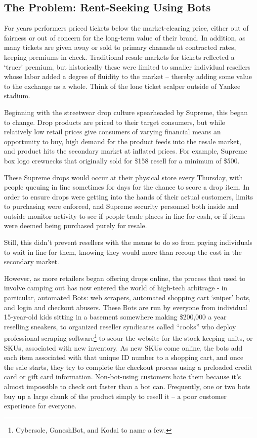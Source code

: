 \documentclass[runningheads]{llncs}
\begin{document}
\subsection{The Problem: Rent-Seeking Using Bots} 
For years performers priced tickets below the market-clearing price, either out of fairness or out of concern for the long-term value of their brand.\cite{4}   In addition, as many tickets are given away or sold to primary channels at contracted rates, keeping premiums in check. Traditional resale markets for tickets reflected a ‘truer’ premium, but historically these were limited to smaller individual resellers whose labor added a degree of fluidity to the market – thereby adding some value to the exchange as a whole.  Think of the lone ticket scalper outside of Yankee stadium.

Beginning with the streetwear drop culture spearheaded by Supreme, this began to change.  Drop products are priced to their target consumers, but while relatively low retail prices give consumers of varying financial means an opportunity to buy, high demand for the product feeds into the resale market, and product hits the secondary market at inflated prices. For example, Supreme box logo crewnecks that originally sold for \$158 resell for a minimum of \$500.\cite{5}

These Supreme drops would occur at their physical store every Thursday, with people queuing in line sometimes for days for the chance to score a drop item.  In order to ensure drops were getting into the hands of their actual customers, limits to purchasing were enforced, and Supreme security personnel both inside and outside monitor activity to see if people trade places in line for cash, or if items were deemed being purchased purely for resale.\cite{6}

Still, this didn’t prevent resellers with the means to do so from paying individuals to wait in line for them, knowing they would more than recoup the cost in the secondary market.

However, as more retailers began offering drops online, the process that used to involve camping out has now entered the world of high-tech arbitrage - in particular, automated Bots: web scrapers, automated shopping cart ‘sniper’ bots, and login and checkout abusers.\cite{3} These Bots are run by everyone from individual 15-year-old kids sitting in a basement somewhere making \$200,000 a year reselling sneakers, to organized reseller syndicates called “cooks” who deploy professional scraping software\footnote{Cybersole, GaneshBot, and Kodai to name a few.}  to scour the website for the stock-keeping units, or SKUs, associated with new inventory. As new SKUs come online, the bots add each item associated with that unique ID number to a shopping cart, and once the sale starts, they try to complete the checkout process using a preloaded credit card or gift card information. Non-bot-using customers hate them because it’s almost impossible to check out faster than a bot can. Frequently, one or two bots buy up a large chunk of the product simply to resell it – a poor customer experience for everyone.\cite{3}
\end{document}
